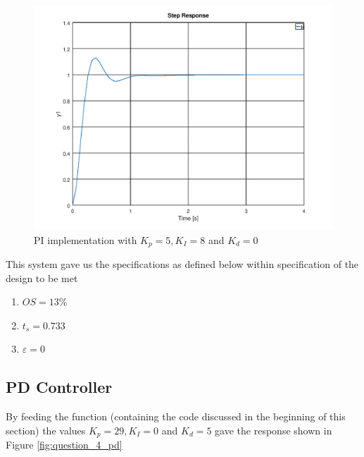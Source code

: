 \documentclass[a4paper, 12pt]{article}
\begin{document}
\begin{figure}[H]
	\centering
	\includegraphics[width=\textwidth]{Images/question_4_PI.png}
	\caption{PI implementation with $K_p = 5, K_I = 8$ and $K_d = 0$}
	\label{fig:question_4_pi}
\end{figure}

This system gave us the specifications as defined below within specification of
the design to be met
\begin{enumerate}
	\item $OS = 13\%$
	\item $t_s = 0.733$
	\item $\varepsilon = 0$
\end{enumerate}


\subsection{PD Controller} %
\label{sub:pd_controller}
By feeding the function (containing the code discussed in the beginning of this section) the values $K_p = 29, K_I = 0$ and $K_d = 5$ gave the response shown in Figure \ref{fig:question_4_pd}
\end{document}

